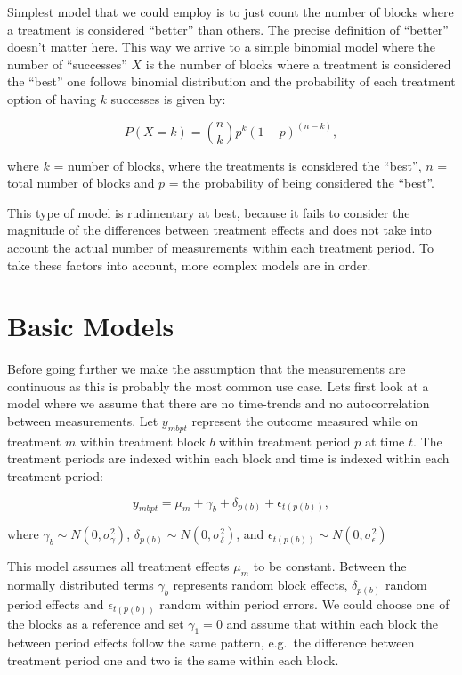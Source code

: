 \documentclass[12pt,a4paper,leqno]{report}
\theoremstyle{plain}
\theoremstyle{definition}
\theoremstyle{remark}
\begin{document}
Simplest model that we could employ is to just count the number of
blocks where a treatment is considered ``better'' than others. The precise
definition of ``better'' doesn't matter here. This way we arrive to a simple binomial
model where the number of ``successes'' \(X\) is the number of blocks where a treatment
is considered the ``best'' one follows binomial distribution and the probability of
each treatment option of having \(k\) successes is given by:

\begin{def}\label{}
\begin{equation}
P(X = k) = {n\choose k}p^k{(1-p)}^{(n-k)},
\end{equation}
\end{def}where \(k\) = number of blocks, where the treatments is considered the ``best'',
\(n\) = total number of blocks and \(p\) = the probability of being considered the ``best''.

This type of model is rudimentary at best, because it fails to consider the magnitude of the
differences between treatment effects and does not take into account the actual number of
measurements within each treatment period. To take these factors into account,
more complex models are in order.

\section{Basic Models}\label{conti}

Before going further we make the assumption that the measurements are continuous as
this is probably the most common use case. Lets first look at a model where we assume
that there are no time-trends and no autocorrelation between measurements.
Let \(y_{mbpt}\) represent the outcome measured while on treatment \(m\) within
treatment block \(b\) within treatment period \(p\) at time \(t\). The treatment
periods are indexed within each block and time is indexed within each treatment
period:

\begin{def}\label{}
\begin{equation}\label{allerrors}
y_{mbpt} = \mu_m + \gamma_b + \delta_{p(b)} + \epsilon_{t(p(b))},
\end{equation}
\end{def}where \(\gamma_b \sim N(0,\sigma^2_{\gamma})\),
\(\delta_{p(b)} \sim N(0,\sigma^2_{\delta})\), and
\(\epsilon_{t(p(b))} \sim N(0,\sigma^2_{\epsilon})\)

This model assumes all treatment effects \(\mu_m\) to be constant. Between the normally
distributed terms \(\gamma_b\) represents random block effects, \(\delta_{p(b)}\)
random period effects and \(\epsilon_{t(p(b))}\) random within period errors. We could choose one
of the blocks as a reference and set \(\gamma_1 = 0\) and assume that within each block
the between period effects follow the same pattern, e.g.\ the difference between treatment
period one and two is the same within each block.
\end{document}
